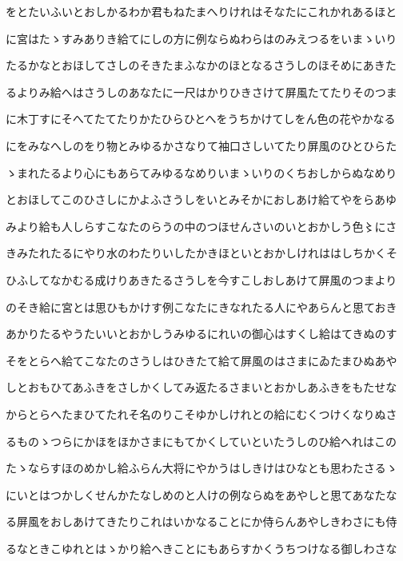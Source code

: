 \documentclass[a4paper,11pt,landscape]{ltjtarticle}
\begin{document}
\par\medskip
をとたいふいとおしかるわか君もねたまへりけれはそなたにこれかれあるほと
\par\medskip
に宮はたゝすみありき給てにしの方に例ならぬわらはのみえつるをいまゝいり
\par\medskip
たるかなとおほしてさしのそきたまふなかのほとなるさうしのほそめにあきた
\par\medskip
るよりみ給へはさうしのあなたに一尺はかりひきさけて屏風たてたりそのつま
\par\medskip
に木丁すにそへてたてたりかたひらひとへをうちかけてしをん色の花やかなる
\par\medskip
にをみなへしのをり物とみゆるかさなりて袖口さしいてたり屏風のひとひらた
\par\medskip
ゝまれたるより心にもあらてみゆるなめりいまゝいりのくちおしからぬなめり
\par\medskip
とおほしてこのひさしにかよふさうしをいとみそかにおしあけ給てやをらあゆ
\par\medskip
みより給も人しらすこなたのらうの中のつほせんさいのいとおかしう色〻にさ
\par\medskip
きみたれたるにやり水のわたりいしたかきほといとおかしけれははしちかくそ
\par\medskip
ひふしてなかむる成けりあきたるさうしを今すこしおしあけて屏風のつまより
\par\medskip
のそき給に宮とは思ひもかけす例こなたにきなれたる人にやあらんと思ておき
\par\medskip
あかりたるやうたいいとおかしうみゆるにれいの御心はすくし給はてきぬのす
\par\medskip
そをとらへ給てこなたのさうしはひきたて給て屏風のはさまにゐたまひぬあや
\par\medskip
しとおもひてあふきをさしかくしてみ返たるさまいとおかしあふきをもたせな
\par\medskip
からとらへたまひてたれそ名のりこそゆかしけれとの給にむくつけくなりぬさ
\par\medskip
るものゝつらにかほをほかさまにもてかくしていといたうしのひ給へれはこの
\par\medskip
たゝならすほのめかし給ふらん大将にやかうはしきけはひなとも思わたさるゝ
\par\medskip
にいとはつかしくせんかたなしめのと人けの例ならぬをあやしと思てあなたな
\par\medskip
る屏風をおしあけてきたりこれはいかなることにか侍らんあやしきわさにも侍
\par\medskip
るなときこゆれとはゝかり給へきことにもあらすかくうちつけなる御しわさな
\end{document}
